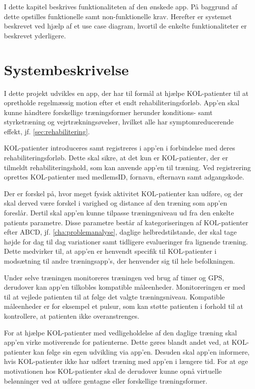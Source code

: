 I dette kapitel beskrives funktionaliteten af den ønskede app. På baggrund af dette opstilles funktionelle samt non-funktionelle krav. Herefter er systemet beskrevet ved hjælp af et use case diagram, hvortil de enkelte funktionaliteter er beskrevet yderligere. 

\section{Systembeskrivelse} \label{sec:systembeskrivelse}
I dette projekt udvikles en app, der har til formål at hjælpe KOL-patienter til at opretholde regelmæssig motion efter et endt rehabiliteringsforløb. App'en skal kunne håndtere forskellige træningsformer herunder konditions- samt styrketræning og vejrtrækningsøvelser, hvilket alle har symptomreducerende effekt, jf. \autoref{sec:rehabilitering}. 

KOL-patienter introduceres samt registreres i app'en i forbindelse med deres rehabiliteringsforløb. 
Dette skal sikre, at det kun er KOL-patienter, der er tilmeldt rehabiliteringshold, som kan anvende app'en til træning. Ved registrering oprettes KOL-patienter med medlemsID, fornavn, efternavn samt adgangskode.  

Der er forskel på, hvor meget fysisk aktivitet KOL-patienter kan udføre, og der skal derved være forskel i varighed og distance af den træning som app'en foreslår. Dertil skal app'en kunne tilpasse træningsniveau ud fra den enkelte patients parametre. Disse parametre består af kategoriseringen af KOL-patienter efter ABCD, jf. \autoref{cha:problemanalyse}, daglige helbredstilstande, der skal tage højde for dag til dag variationer samt tidligere evalueringer fra lignende træning. Dette medvirker til, at app'en er henvendt specifik til KOL-patienter i modsætning til andre træningsapp's, der henvender sig til hele befolkningen. 

Under selve træningen monitoreres træningen ved brug af timer og GPS, derudover kan app'en tilkobles kompatible måleenheder. Monitoreringen er med til at vejlede patienten til at følge det valgte træningsniveau. Kompatible måleenheder er for eksempel et pulsur, som kan støtte patienten i forhold til at kontrollere, at patienten ikke overanstrenges. 

For at hjælpe KOL-patienter med vedligeholdelse af den daglige træning skal app’en virke motiverende for patienterne. Dette gøres blandt andet ved, at KOL-patienter kan følge sin egen udvikling via app'en. Desuden skal app'en informere, hvis KOL-patienter ikke har udført træning med app'en i længere tid. For at øge motivationen hos KOL-patienter skal de derudover kunne opnå virtuelle belønninger ved at udføre gentagne eller forskellige træningsformer.\citep{Gade2007, Tricomi2016}

